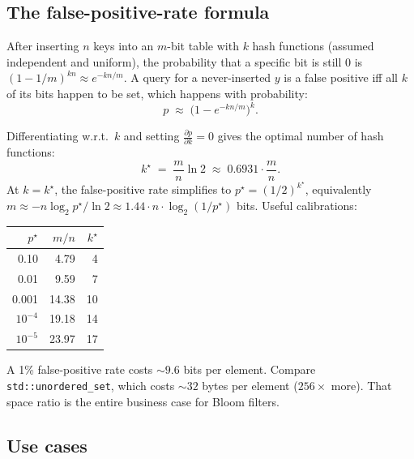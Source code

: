\documentclass[11pt]{article}
\begin{document}
\subsection*{The false-positive-rate formula}

After inserting $n$ keys into an $m$-bit table with $k$ hash
functions (assumed independent and uniform), the probability that
a specific bit is still $0$ is
$\left(1 - 1/m\right)^{kn} \approx e^{-kn/m}$.
A query for a never-inserted $y$ is a false positive iff all $k$ of
its bits happen to be set, which happens with probability:
\[
p \;\approx\; \bigl(1 - e^{-kn/m}\bigr)^k.
\]

Differentiating w.r.t.\ $k$ and setting $\frac{\partial p}{\partial k}=0$
gives the optimal number of hash functions:
\[
k^\star \;=\; \frac{m}{n} \ln 2 \;\approx\; 0.6931 \cdot \frac{m}{n}.
\]
At $k = k^\star$, the false-positive rate simplifies to
$p^\star = (1/2)^{k^\star}$, equivalently $m \approx -n \log_2 p^\star
/ \ln 2 \approx 1.44 \cdot n \cdot \log_2(1/p^\star)$ bits. Useful
calibrations:

\begin{center}
\begin{tabular}{rrr}
\hline
$p^\star$ & $m / n$ & $k^\star$ \\
\hline
0.10  & 4.79  & 4 \\
0.01  & 9.59  & 7 \\
0.001 & 14.38 & 10 \\
$10^{-4}$ & 19.18 & 14 \\
$10^{-5}$ & 23.97 & 17 \\
\hline
\end{tabular}
\end{center}

A 1\% false-positive rate costs $\sim 9.6$ bits per element.
Compare \texttt{std::unordered\_set}, which costs $\sim 32$ bytes
per element ($256\times$ more). That space ratio is the entire
business case for Bloom filters.

\subsection*{Use cases}
\end{document}
